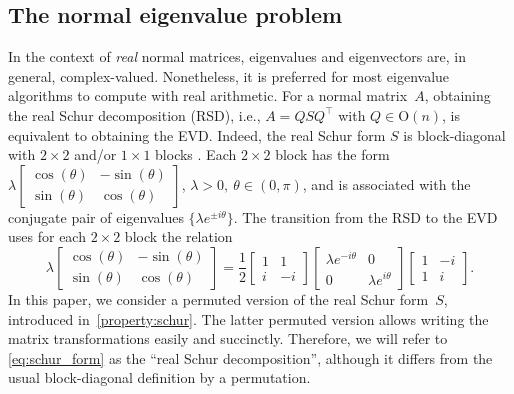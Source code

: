 \documentclass[10pt,twoside,dvipsnames]{siamart1116}
\numberwithin{algorithm}{section}
\numberwithin{equation}{section}
\begin{document}
\subsection{The normal eigenvalue problem}
In the context of \emph{real} normal matrices, eigenvalues and eigenvectors are, in general, complex-valued. Nonetheless, it is preferred for most eigenvalue algorithms to compute with real arithmetic. %
For a normal matrix~$A$, obtaining the real Schur decomposition (RSD), i.e., $A=QSQ^\top $ with $Q\in \mathrm{O}(n)$, is equivalent to obtaining the EVD. Indeed, the real Schur form $S$ is block-diagonal with $2\times 2$ and/or $1\times 1$ blocks \cite[Thm~2.5.8]{horn13}. Each $2\times 2$ block has the form $\lambda\left[\begin{smallmatrix}
	\cos(\theta)&-\sin(\theta)\\
	\sin(\theta)&\cos(\theta)
	\end{smallmatrix}\right]$, $\lambda>0,\ \theta\in(0,\pi)$, and is associated with the conjugate pair of eigenvalues $\{\lambda e^{\pm i\theta}\}$. The transition from the RSD to the EVD uses for each $2\times2$ block the relation
\begin{equation}\label{eq:RSDtoEVD}
	\lambda\begin{bmatrix}
	\cos(\theta)&-\sin(\theta)\\
	\sin(\theta)&\cos(\theta)
	\end{bmatrix} = \frac{1}{2}\begin{bmatrix}
	1&1\\
	i&-i
	\end{bmatrix}\begin{bmatrix}
	\lambda e^{-i\theta}&0\\
	0&\lambda e^{i\theta}
	\end{bmatrix}\begin{bmatrix}
	1&-i\\
	1&i
	\end{bmatrix}.
\end{equation}
In this paper, we consider a permuted version of the real Schur form~$S$, introduced in~\cref{property:schur}. The latter permuted version allows writing the matrix transformations easily and succinctly. Therefore, we will refer to \eqref{eq:schur_form} as the ``real Schur decomposition'', although it differs from the usual block-diagonal definition by a permutation.
\end{document}
